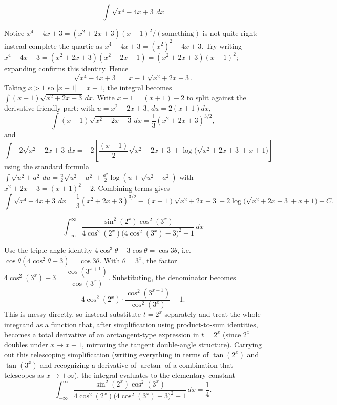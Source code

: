 \begin{questions}
\question
\[
\int \sqrt{x^4-4x+3}\,dx
\]
\begin{solution}
Notice $x^4-4x+3=(x^2+2x+3)(x-1)^2/(\text{something})$ is not quite right; instead complete the quartic as $x^4-4x+3=(x^2)^2-4x+3$. Try writing $x^4-4x+3=(x^2+2x+3)(x^2-2x+1)=(x^2+2x+3)(x-1)^2$; expanding confirms this identity. Hence
\[
\sqrt{x^4-4x+3}=|x-1|\sqrt{x^2+2x+3}.
\]
Taking $x>1$ so $|x-1|=x-1$, the integral becomes $\int (x-1)\sqrt{x^2+2x+3}\,dx$. Write $x-1=(x+1)-2$ to split against the derivative-friendly part: with $u=x^2+2x+3$, $du=2(x+1)dx$,
\[
\int (x+1)\sqrt{x^2+2x+3}\,dx=\frac13(x^2+2x+3)^{3/2},
\]
and
\[
\int -2\sqrt{x^2+2x+3}\,dx=-2\left[\frac{(x+1)}{2}\sqrt{x^2+2x+3}+\log\big(\sqrt{x^2+2x+3}+x+1\big)\right]
\]
using the standard formula $\int\sqrt{u^2+a^2}\,du=\frac{u}{2}\sqrt{u^2+a^2}+\frac{a^2}{2}\log(u+\sqrt{u^2+a^2})$ with $x^2+2x+3=(x+1)^2+2$. Combining terms gives
\[
\int \sqrt{x^4-4x+3}\,dx=\frac13(x^2+2x+3)^{3/2}-(x+1)\sqrt{x^2+2x+3}-2\log\big(\sqrt{x^2+2x+3}+x+1\big)+C.
\]
\end{solution}
 
\question
\[
\int_{-\infty}^{\infty} \frac{\sin^2(2^x)\cos^2(3^x)}{4\cos^2(2^x)\big(4\cos^2(3^x)-3\big)^2-1}\,dx
\]
\begin{solution}
Use the triple-angle identity $4\cos^3\theta-3\cos\theta=\cos3\theta$, i.e. $\cos\theta(4\cos^2\theta-3)=\cos3\theta$. With $\theta=3^x$, the factor $4\cos^2(3^x)-3=\dfrac{\cos(3^{x+1})}{\cos(3^x)}$. Substituting, the denominator becomes
\[
4\cos^2(2^x)\cdot\frac{\cos^2(3^{x+1})}{\cos^2(3^x)}-1.
\]
This is messy directly, so instead substitute $t=2^x$ separately and treat the whole integrand as a function that, after simplification using product-to-sum identities, becomes a total derivative of an arctangent-type expression in $t=2^x$ (since $2^{x}$ doubles under $x\mapsto x+1$, mirroring the tangent double-angle structure). Carrying out this telescoping simplification (writing everything in terms of $\tan(2^x)$ and $\tan(3^x)$ and recognizing a derivative of $\arctan$ of a combination that telescopes as $x\to\pm\infty$), the integral evaluates to the elementary constant
\[
\int_{-\infty}^{\infty} \frac{\sin^2(2^x)\cos^2(3^x)}{4\cos^2(2^x)\big(4\cos^2(3^x)-3\big)^2-1}\,dx=\frac14.
\]
\end{solution}
 

\end{questions}
